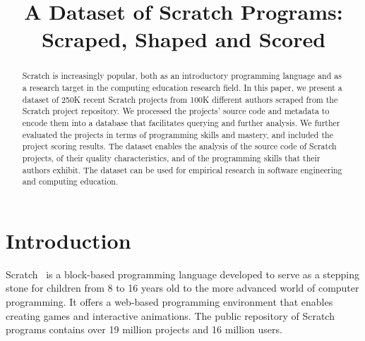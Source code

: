 \documentclass[10pt, conference]{IEEEtran}
\begin{document}
\title{A Dataset of Scratch Programs:\\Scraped, Shaped and Scored}


%	

\maketitle


\begin{abstract}
Scratch is increasingly popular, both as an introductory programming language and as a research target in the computing education research field.	
In this paper, we present a dataset of 250K recent Scratch projects from 100K different authors scraped from the Scratch project repository.
We processed the projects' source code and metadata to encode them into a database that facilitates querying and further analysis. We further evaluated the projects in terms of programming skills and mastery, and included the project scoring results.
The dataset enables the analysis of the source code of Scratch projects, of their quality characteristics, and of the programming skills that their authors exhibit.
The dataset can be used for empirical research in software engineering and computing education.
\end{abstract}
 
\section{Introduction}
Scratch~\cite{resnick_scratch:_2009} is a block-based programming language developed to serve as a stepping stone for children from 8 to 16 years old to the more advanced world of computer programming.
It offers a web-based programming environment that enables creating games and interactive animations. The public repository of Scratch programs contains over 19 million projects and 16 million users.
\end{document}
